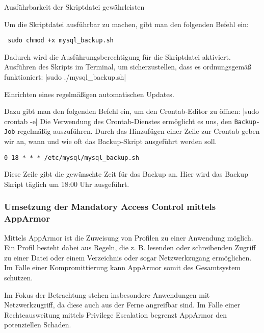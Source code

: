 Ausführbarkeit der Skriptdatei gewährleisten

Um die Skriptdatei ausführbar zu machen, gibt man den folgenden Befehl ein:
\begin{verbatim} sudo chmod +x mysql_backup.sh \end{verbatim}
Dadurch wird die Ausführungsberechtigung für die Skriptdatei aktiviert.
Ausführen des Skripts im Terminal, um sicherzustellen, dass es ordnungsgemäß funktioniert:
|sudo ./mysql_backup.sh|

Einrichten eines regelmäßigen automatischen Updates.

Dazu gibt man den folgenden Befehl ein, um den Crontab-Editor zu öffnen:
|sudo crontab -e|
Die Verwendung des Crontab-Dienstes ermöglicht es uns, den \verb+Backup-Job+ regelmäßig auszuführen. Durch das Hinzufügen einer Zeile zur Crontab geben wir an, wann und wie oft das Backup-Skript ausgeführt werden soll. 

\begin{verbatim}0 18 * * * /etc/mysql/mysql_backup.sh\end{verbatim}

Diese Zeile gibt die gewünschte Zeit für das Backup an. Hier wird das Backup Skript täglich um 18:00 Uhr ausgeführt.



\subsubsection{Umsetzung der Mandatory Access Control mittels AppArmor}

Mittels AppArmor ist die Zuweisung von Profilen zu einer Anwendung möglich. Ein Profil besteht dabei aus Regeln, die z. B. lesenden oder schreibenden Zugriff zu einer Datei oder einem Verzeichnis oder sogar Netzwerkzugang ermöglichen. Im Falle einer Kompromittierung kann AppArmor somit des Gesamtsystem schützen.

Im Fokus der Betrachtung stehen insbesondere Anwendungen mit Netzwerkzugriff, da diese auch aus der Ferne angreifbar sind. Im Falle einer Rechteausweitung mittels Privilege Escalation begrenzt AppArmor den potenziellen Schaden\cite{hutchinsIntelligenceDrivenComputerNetwork}.

